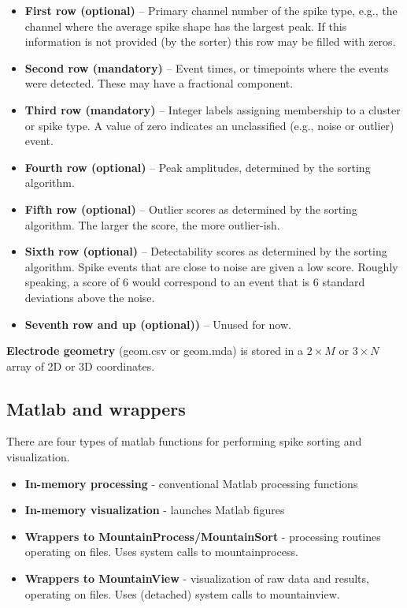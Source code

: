 \documentclass{article}
\begin{document}
\begin{itemize}
\item{\textbf{First row (optional)} -- Primary channel number of the spike type, e.g., the channel where the average spike shape has the largest peak. If this information is not provided (by the sorter) this row may be filled with zeros.}
\item{\textbf{Second row (mandatory)} -- Event times, or timepoints where the events were detected. These may have a fractional component.}
\item{\textbf{Third row (mandatory)} -- Integer labels assigning membership to a cluster or spike type. A value of zero indicates an unclassified (e.g., noise or outlier) event.}
\item{\textbf{Fourth row (optional)} -- Peak amplitudes, determined by the sorting algorithm.}
\item{\textbf{Fifth row (optional)} -- Outlier scores as determined by the sorting algorithm. The larger the score, the more outlier-ish.}
\item{\textbf{Sixth row (optional)} -- Detectability scores as determined by the sorting algorithm. Spike events that are close to noise are given a low score. Roughly speaking, a score of $6$ would correspond to an event that is $6$ standard deviations above the noise.}
\item{\textbf{Seventh row and up (optional))} -- Unused for now.}
\end{itemize}

\textbf{Electrode geometry} (geom.csv or geom.mda) is stored in a $2\times M$ or $3\times N$ array of 2D or 3D coordinates.

\subsection{Matlab and wrappers}

There are four types of matlab functions for performing spike sorting and visualization.

\begin{itemize}
\item{\textbf{In-memory processing} - conventional Matlab processing functions}
\item{\textbf{In-memory visualization} - launches Matlab figures}
\item{\textbf{Wrappers to MountainProcess/MountainSort} - processing routines 
operating on files. Uses system calls to mountainprocess.}
\item{\textbf{Wrappers to MountainView} - visualization of raw data and results, operating on files. Uses (detached) system calls to mountainview.}
\end{itemize}
\end{document}
